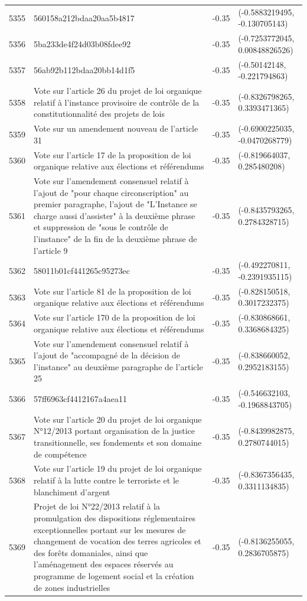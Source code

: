 \begin{table}[ht]
\begin{tabular}{rlrl}
  5355 & 560158a212bdaa20aa5b4817 & -0.35 & (-0.5883219495, -0.130705143) \\ 
  5356 & 5ba233de4f24d03b08fdee92 & -0.35 & (-0.7253772045, 0.00848826526) \\ 
  5357 & 56ab92b112bdaa20bb14d1f5 & -0.35 & (-0.50142148, -0.221794863) \\ 
  5358 & Vote sur l'article 26 du projet de loi organique relatif à l'instance provisoire de contrôle de la constitutionnalité des projets de lois & -0.35 & (-0.8326798265, 0.3393471365) \\ 
  5359 & Vote sur un amendement nouveau de l'article 31 & -0.35 & (-0.6900225035, -0.0470268779) \\ 
  5360 & Vote sur l'article 17 de la proposition de loi organique relative aux élections et référendums & -0.35 & (-0.819664037, 0.285480208) \\ 
  5361 & Vote sur l'amendement consensuel relatif à l'ajout de "pour chaque circonscription" au premier paragraphe, l'ajout de "L'Instance se charge aussi d'assister" à la deuxième phrase et suppression de "sous le contrôle de l'instance" de la fin de la deuxième phrase de l'article 9 & -0.35 & (-0.8435793265, 0.2784328715) \\ 
  5362 & 58011b01cf441265c95273ec & -0.35 & (-0.492270811, -0.2391935115) \\ 
  5363 & Vote sur l'article 81 de la proposition de loi organique relative aux élections et référendums & -0.35 & (-0.828150518, 0.3017232375) \\ 
  5364 & Vote sur l'article 170 de la proposition de loi organique relative aux élections et référendums & -0.35 & (-0.830868661, 0.3368684325) \\ 
  5365 & Vote sur l'amendement consensuel relatif à l'ajout de "accompagné de la décision de l’instance" au deuxième paragraphe de l'article 25 & -0.35 & (-0.838660052, 0.2952183155) \\ 
  5366 & 57ff6963cf4412167a4aea11 & -0.35 & (-0.546632103, -0.1968843705) \\ 
  5367 & Vote sur l'article 20 du projet de loi organique N°12/2013 portant organisation de la justice transitionnelle, ses fondements et son domaine de compétence & -0.35 & (-0.8439982875, 0.2780744015) \\ 
  5368 & Vote sur l'article 19 du projet de loi organique relatif à la lutte contre le terroriste et le blanchiment d'argent & -0.35 & (-0.8367356435, 0.3311134835) \\ 
  5369 & Projet de loi N°22/2013 relatif à la promulgation des dispositions réglementaires exceptionnelles portant sur les mesures de changement de vocation des terres agricoles et des forêts domaniales, ainsi que l'aménagement des espaces réservés au programme de logement social et la création de zones industrielles & -0.35 & (-0.8136255055, 0.2836705875) \\ 

\end{tabular}
\end{table}
